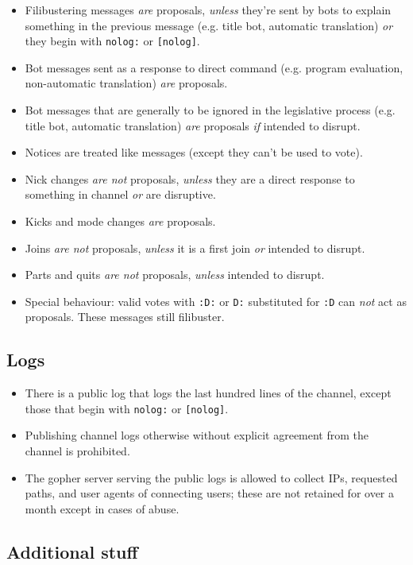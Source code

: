 \documentclass[11pt]{article}
\begin{document}
\begin{itemize}
\item Filibustering messages \emph{are} proposals, \emph{unless} they're sent by 
bots to explain something in the previous message (e.g. title bot, automatic translation) 
\emph{or} they begin with \texttt{nolog:} or \texttt{[nolog]}.
\item Bot messages sent as a response to direct command (e.g. program evaluation,
non-automatic translation) \emph{are} proposals.
\item Bot messages that are generally to be ignored in the legislative process (e.g. title
bot, automatic translation) \emph{are} proposals \emph{if} intended to disrupt.
\item Notices are treated like messages (except they can't be used to vote).
\item Nick changes \emph{are not} proposals, \emph{unless} they are a direct response
to something in channel \emph{or} are disruptive.
\item Kicks and mode changes \emph{are} proposals.
\item Joins \emph{are not} proposals, \emph{unless} it is a first join \emph{or} intended
to disrupt.
\item Parts and quits \emph{are not} proposals, \emph{unless} intended to disrupt.
\item Special behaviour: valid votes with \texttt{:D:} or \texttt{D:} substituted for \texttt{:D}
can \emph{not} act as proposals. These messages still filibuster.
\end{itemize}


\subsection{Logs}

\begin{itemize}
\item There is a public log that logs the last hundred lines of the channel, except those that
begin with \texttt{nolog:} or \texttt{[nolog]}.
\item Publishing channel logs otherwise without explicit agreement from the channel is
prohibited.
\item The gopher server serving the public logs is allowed to collect IPs, requested paths,
and user agents of connecting users; these are not retained for over a month except in cases
of abuse.
\end{itemize}


\subsection{Additional stuff}
\end{document}
